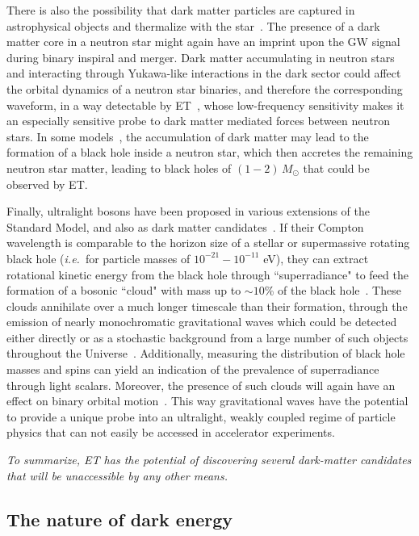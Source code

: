 There is also the possibility that dark matter particles are captured in astrophysical
objects and thermalize with the star~\cite{Gould:1989gw}. The presence of a dark matter core in a neutron star
might again have an imprint upon the GW signal during binary inspiral and merger.
Dark matter accumulating in neutron stars and interacting through Yukawa-like interactions in the dark sector could affect the orbital dynamics of a neutron star binaries, and therefore the corresponding waveform, in a way detectable by ET~\cite{Alexander:2018qzg}, whose low-frequency sensitivity makes it an especially sensitive probe to dark matter mediated forces between neutron stars.
In some models~\cite{Bramante:2017ulk,Kouvaris:2018wnh}, the accumulation of dark matter may lead to the formation of a black hole 
inside a neutron star, which then accretes the remaining neutron star matter, leading to 
black holes of $(1-2) \,M_\odot$ that could be observed by ET. 

Finally, ultralight bosons have been proposed in various extensions of the Standard Model, and also as  dark matter candidates~\cite{Essig:2013lka,Hui:2016ltb}. If their
Compton wavelength is comparable to the horizon size of a stellar or supermassive 
rotating black hole (\emph{i.e.}~for particle masses of $10^{-21} - 10^{-11}$ eV),
they can extract rotational kinetic energy from the black hole through ``superradiance" 
to feed the formation
of a bosonic ``cloud" with mass up to $\sim 10$\% of the black hole~\cite{Arvanitaki:2010sy,Brito:2014wla, East:2017ovw}. These clouds
annihilate over a much longer timescale than their formation, through the emission of 
nearly monochromatic gravitational waves which could be detected either directly 
or as a stochastic background from a large number of such objects throughout the Universe~\cite{Brito:2017zvb, Brito:2017wnc}.
Additionally, measuring the distribution of black hole masses and spins can yield
an indication of the prevalence of superradiance through light scalars. Moreover, 
the presence of such clouds will again have an effect on binary orbital motion~\cite{Baumann:2018vus}. 
This way gravitational waves have the potential to provide a unique probe into 
an ultralight, weakly coupled regime of particle physics that can not easily be
accessed in accelerator experiments.

{\em To summarize, ET has the potential of discovering several dark-matter candidates that will be unaccessible by any other means.}

     
\subsection{The nature of dark energy}\label{sec:cosmos}

